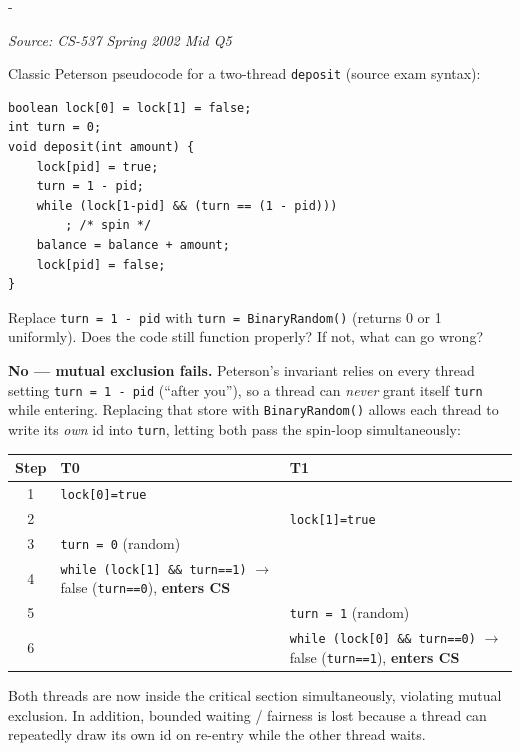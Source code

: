 \documentclass[11pt,a4paper]{article}
\makeatletter
\newcommand{\keepspace}[1]{\par\penalty-100\begingroup
  \setlength{\dimen@}{#1}\dimen@ii\pagegoal\advance\dimen@ii-\pagetotal
  \ifdim\dimen@>\dimen@ii\ifdim\dimen@ii>\z@\vfil\fi\break\fi\endgroup}
\newcounter{qn}[section]
\newenvironment{Qn}[4]{%
  \refstepcounter{qn}\keepspace{7\baselineskip}%
  \begin{tcolorbox}[qboxstyle, title={Q\thesection.\theqn\ \ [#1 \textbar\ #2]\ \ #4}]%
  {\footnotesize\color{g3}\textit{Source: #3}}\par\smallskip%
}{%
  \end{tcolorbox}%
}
\newenvironment{Sol}{%
  \begin{tcolorbox}[sboxstyle, title={Solution}]%
}{%
  \end{tcolorbox}\vspace{0.35em}%
}
\makeatother
\begin{document}
\begin{Qn}{Hard}{Lect 17}{CS-537 Spring 2002 Mid Q5}{Peterson, but \texttt{turn} is a coin flip}
Classic Peterson pseudocode for a two-thread \texttt{deposit} (source exam syntax):

\begin{lstlisting}[numbers=none]
boolean lock[0] = lock[1] = false;
int turn = 0;
void deposit(int amount) {
    lock[pid] = true;
    turn = 1 - pid;
    while (lock[1-pid] && (turn == (1 - pid)))
        ; /* spin */
    balance = balance + amount;
    lock[pid] = false;
}
\end{lstlisting}

Replace \texttt{turn = 1 - pid} with \texttt{turn = BinaryRandom()} (returns 0 or 1 uniformly). Does the code still function properly? If not, what can go wrong?
\end{Qn}
\begin{Sol}
\textbf{No --- mutual exclusion fails.} Peterson's invariant relies on every thread setting \texttt{turn = 1 - pid} (``after you''), so a thread can \emph{never} grant itself \texttt{turn} while entering. Replacing that store with \texttt{BinaryRandom()} allows each thread to write its \emph{own} id into \texttt{turn}, letting both pass the spin-loop simultaneously:

\begin{center}
\small
\begin{tabularx}{\linewidth}{@{}c|X|X@{}}
Step & T0 & T1 \\
\hline
1 & \texttt{lock[0]=true} & \\
2 & & \texttt{lock[1]=true} \\
3 & \texttt{turn = 0} (random) & \\
4 & \texttt{while (lock[1] \&\& turn==1)} $\to$ false (\texttt{turn==0}), \textbf{enters CS} & \\
5 & & \texttt{turn = 1} (random) \\
6 & & \texttt{while (lock[0] \&\& turn==0)} $\to$ false (\texttt{turn==1}), \textbf{enters CS} \\
\end{tabularx}
\end{center}

Both threads are now inside the critical section simultaneously, violating mutual exclusion. In addition, bounded waiting / fairness is lost because a thread can repeatedly draw its own id on re-entry while the other thread waits.
\end{Sol}
\end{document}
